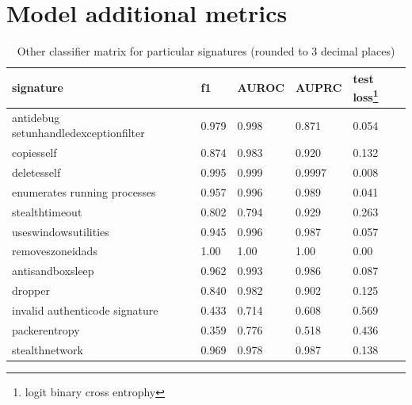 \chapter{Model additional metrics} \label{app:models}

\begin{table}[h]
    \centering
    \caption{Other classifier matrix for particular signatures (rounded to 3 decimal places)}
    \begin{minipage}{\linewidth}
    \begin{tabular}{lllll}
      \toprule
      \textbf{signature} &
      \textbf{f1} &
      \textbf{AUROC} &
      \textbf{AUPRC} &
      \textbf{test loss}\footnote{logit binary cross entrophy}
      \\
      \midrule
      antidebug setunhandledexceptionfilter & 0.979 & 0.998 & 0.871 & 0.054  \\
      \midrule
      copiesself &  0.874 & 0.983 & 0.920 & 0.132 \\
      \midrule
      deletesself &  0.995 & 0.999 & 0.9997 & 0.008 \\
      \midrule
      enumerates running processes & 0.957 & 0.996 & 0.989 & 0.041 \\
      \midrule
      stealthtimeout & 0.802 & 0.794 & 0.929 &  0.263 \\
      \midrule
      useswindowsutilities & 0.945 & 0.996 & 0.987 &  0.057 \\
      \midrule
      removeszoneidads & 1.00 & 1.00 & 1.00 & 0.00 \\
      \midrule
      antisandboxsleep & 0.962 & 0.993 & 0.986 & 0.087 \\
      \midrule
      dropper & 0.840 & 0.982 & 0.902 & 0.125 \\
      \midrule
      invalid authenticode signature & 0.433 & 0.714 & 0.608 & 0.569 \\
      \midrule
      packerentropy & 0.359 & 0.776 & 0.518 & 0.436 \\
      \midrule
      stealthnetwork & 0.969 & 0.978 & 0.987 & 0.138 \\
      \bottomrule
    \end{tabular}
    \end{minipage}
    \label{tab:additional_metrics}
  \end{table}


